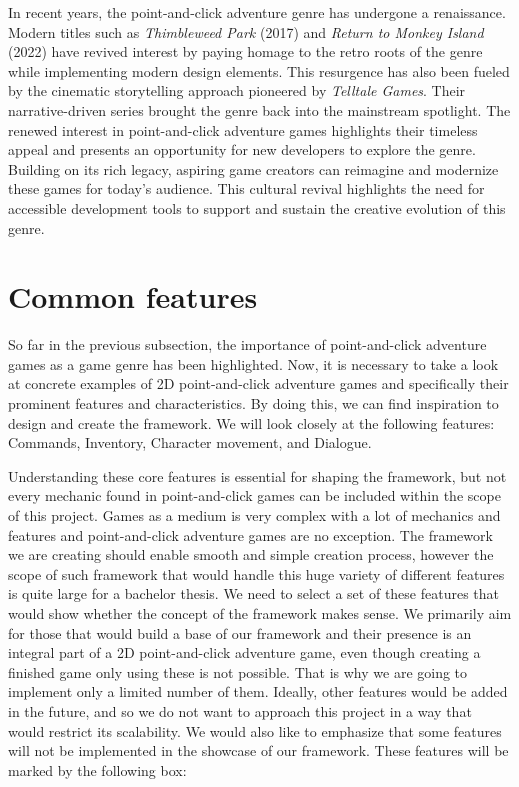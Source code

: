 In recent years, the point-and-click adventure genre has undergone a renaissance. Modern titles such as \textit{Thimbleweed Park} (2017) and \textit{Return to Monkey Island} (2022) have revived interest by paying homage to the retro roots of the genre while implementing modern design elements. This resurgence has also been fueled by the cinematic storytelling approach pioneered by \textit{Telltale Games}. Their narrative-driven series brought the genre back into the mainstream spotlight. The renewed interest in point-and-click adventure games highlights their timeless appeal and presents an opportunity for new developers to explore the genre. Building on its rich legacy, aspiring game creators can reimagine and modernize these games for today's audience. This cultural revival highlights the need for accessible development tools to support and sustain the creative evolution of this genre.

\section{Common features}
\label{sec:Common features}
So far in the previous subsection, the importance of point-and-click adventure games as a game genre has been highlighted. Now, it is necessary to take a look at concrete examples of 2D point-and-click adventure games and specifically their prominent features and characteristics. By doing this, we can find inspiration to design and create the framework. We will look closely at the following features: Commands, Inventory, Character movement, and Dialogue.

Understanding these core features is essential for shaping the framework, but not every mechanic found in point-and-click games can be included within the scope of this project. Games as a medium is very complex with a lot of mechanics and features and point-and-click adventure games are no exception. The framework we are creating should enable smooth and simple creation process, however the scope of such framework that would handle this huge variety of different features is quite large for a bachelor thesis. We need to select a set of these features that would show whether the concept of the framework makes sense. We primarily aim for those that would build a base of our framework and their presence is an integral part of a 2D point-and-click adventure game, even though creating a finished game only using these is not possible. That is why we are going to implement only a limited number of them. Ideally, other features would be added in the future, and so we do not want to approach this project in a way that would restrict its scalability. We would also like to emphasize that some features will not be implemented in the showcase of our framework. These features will be marked by the following box:

